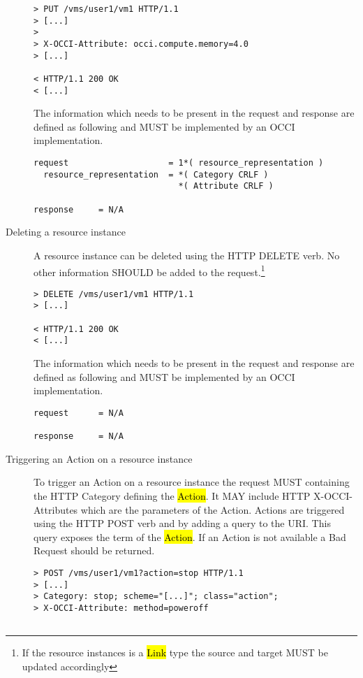 \documentclass[10pt,a4paper]{article}
\begin{document}
\begin{description}
\begin{verbatim}
> PUT /vms/user1/vm1 HTTP/1.1
> [...]
> 
> X-OCCI-Attribute: occi.compute.memory=4.0
> [...]
 
< HTTP/1.1 200 OK
< [...]
\end{verbatim}

    The information which needs to be present in the request and
    response are defined as following and MUST be implemented by an
    OCCI implementation.

\begin{verbatim}
request                    = 1*( resource_representation )
  resource_representation  = *( Category CRLF )
                             *( Attribute CRLF )

response     = N/A
\end{verbatim}

  \item[Deleting a resource instance] A resource instance can be
    deleted using the HTTP DELETE verb. No other information SHOULD be
    added to the request.\footnote{If the resource instances is a
      \hl{Link} type the source and target MUST be updated
      accordingly}

\begin{verbatim}
> DELETE /vms/user1/vm1 HTTP/1.1
> [...]

< HTTP/1.1 200 OK
< [...]
\end{verbatim}

    The information which needs to be present in the request and
    response are defined as following and MUST be implemented by an
    OCCI implementation.

\begin{verbatim}
request      = N/A

response     = N/A
\end{verbatim}

  \item[Triggering an Action on a resource instance] To trigger an
    Action on a resource instance the request MUST containing the HTTP
    Category defining the \hl{Action}. It MAY include HTTP
    X-OCCI-Attributes which are the parameters of the Action. Actions
    are triggered using the HTTP POST verb and by adding a query to
    the URI. This query exposes the term of the \hl{Action}. If an
    Action is not available a Bad Request should be returned.

\begin{verbatim}
> POST /vms/user1/vm1?action=stop HTTP/1.1
> [...]
> Category: stop; scheme="[...]"; class="action";
> X-OCCI-Attribute: method=poweroff


\end{verbatim}
\end{description}
\end{document}

